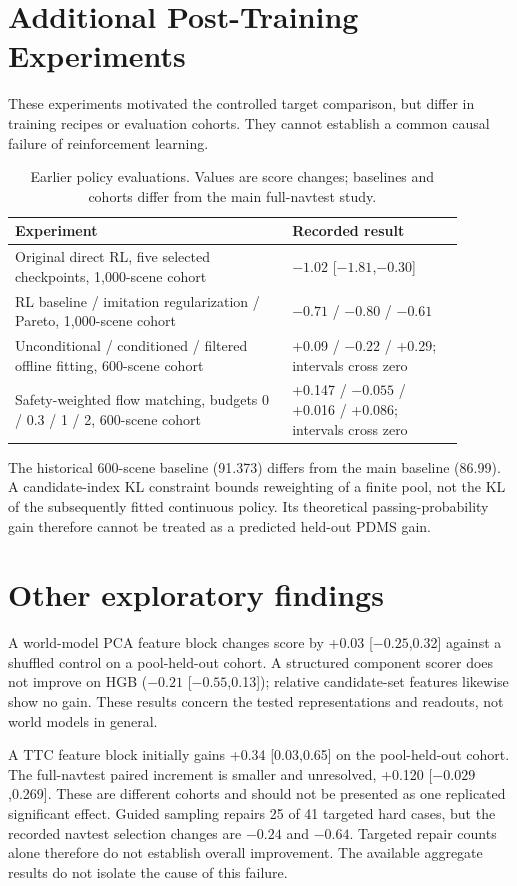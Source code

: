 \documentclass[10pt,letterpaper]{article}
\begin{document}
\FloatBarrier
\section{Additional Post-Training Experiments}
These experiments motivated the controlled target comparison, but differ in training recipes or evaluation cohorts. They cannot establish a common causal failure of reinforcement learning.
\begin{table}[H]
\centering\caption{Earlier policy evaluations. Values are score changes; baselines and cohorts differ from the main full-navtest study.}
\begin{tabular}{p{0.55\linewidth}p{0.34\linewidth}}\toprule
Experiment & Recorded result\\\midrule
Original direct RL, five selected checkpoints, 1,000-scene cohort & $-1.02$ [$-1.81$,$-0.30$]\\
RL baseline / imitation regularization / Pareto, 1,000-scene cohort & $-0.71$ / $-0.80$ / $-0.61$\\
Unconditional / conditioned / filtered offline fitting, 600-scene cohort & +0.09 / $-0.22$ / +0.29; intervals cross zero\\
Safety-weighted flow matching, budgets 0 / 0.3 / 1 / 2, 600-scene cohort & +0.147 / $-0.055$ / +0.016 / +0.086; intervals cross zero\\\bottomrule
\end{tabular}
\end{table}
The historical 600-scene baseline (91.373) differs from the main baseline (86.99). A candidate-index KL constraint bounds reweighting of a finite pool, not the KL of the subsequently fitted continuous policy. Its theoretical passing-probability gain therefore cannot be treated as a predicted held-out PDMS gain.

\FloatBarrier
\section{Other exploratory findings}
A world-model PCA feature block changes score by +0.03 [$-0.25$,0.32] against a shuffled control on a pool-held-out cohort. A structured component scorer does not improve on HGB ($-0.21$ [$-0.55$,0.13]); relative candidate-set features likewise show no gain. These results concern the tested representations and readouts, not world models in general.

A TTC feature block initially gains +0.34 [0.03,0.65] on the pool-held-out cohort. The full-navtest paired increment is smaller and unresolved, +0.120 [$-0.029$,0.269]. These are different cohorts and should not be presented as one replicated significant effect. Guided sampling repairs 25 of 41 targeted hard cases, but the recorded navtest selection changes are $-0.24$ and $-0.64$. Targeted repair counts alone therefore do not establish overall improvement. The available aggregate results do not isolate the cause of this failure.
\end{document}

